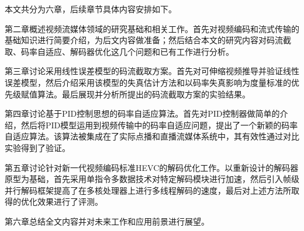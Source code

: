 本文共分为六章，后续章节具体内容安排如下。

第二章概述视频流媒体领域的研究基础和相关工作。首先对视频编码和流式传输的基础知识进行简要介绍，为后文内容做准备；然后结合本文的研究内容对码流截取、码率自适应、解码器优化这几个问题和已有工作进行分析。

第三章讨论采用线性误差模型的码流截取方案。首先对可伸缩视频推导并验证线性误差模型，然后介绍采用该模型的失真估计方法和以码率失真影响为度量标准的优先级赋值算法。最后展现并分析所提出的码流截取方案的实验结果。

第四章讨论基于PID控制思想的码率自适应算法。首先对PID控制器做简单的介绍，然后将PID模型运用到视频传输中的码率自适应问题，提出了一个新颖的码率自适应算法。该算法被集成在了实际点播和直播流媒体系统中，其有效性通过对比实验得到了验证。

第五章讨论针对新一代视频编码标准HEVC的解码优化工作。以重新设计的解码器原型为基础，首先采用单指令多数据技术对特定解码模块进行加速，然后引入帧级并行解码框架提高了在多核处理器上进行多线程解码的速度，最后对上述方法所取得的优化效果进行了评测。

第六章总结全文内容并对未来工作和应用前景进行展望。